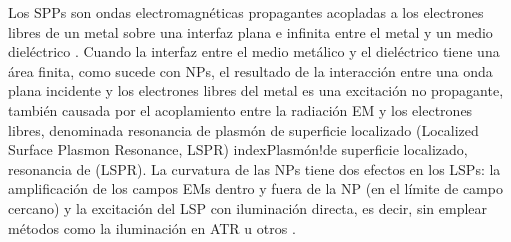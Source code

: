 Los SPPs son ondas electromagnéticas propagantes acopladas a los electrones libres de un metal sobre una interfaz plana e infinita entre el metal y un medio dieléctrico \cite{maier2007plasmonics}. Cuando la interfaz  entre el medio metálico y el dieléctrico tiene una área finita, como sucede con NPs, el resultado de la interacción entre una onda plana incidente y los electrones libres del metal es una excitación no propagante, también causada por el acoplamiento entre la radiación EM y los electrones libres, denominada resonancia de plasmón de superficie localizado (Localized Surface Plasmon Resonance, LSPR) \cite{maier2007plasmonics}index{Plasmón!de superficie localizado, resonancia de (LSPR)}. La curvatura de las NPs tiene dos efectos en los LSPs: la amplificación de los campos EMs dentro y fuera de la NP (en el  límite de campo cercano) y la excitación del LSP con iluminación directa, es decir, sin emplear métodos como la iluminación en ATR u otros \cite{maier2007plasmonics}.

